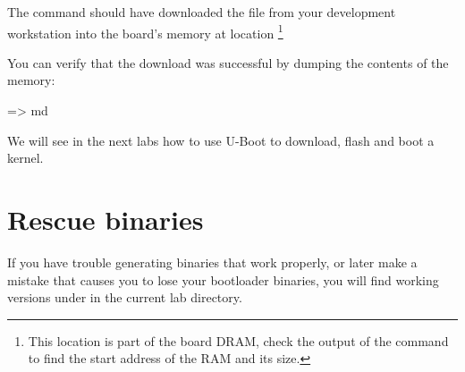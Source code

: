 The  command should have downloaded the 
file from your development workstation into the board's memory at
location {\tt \zimageboardaddr}\footnote{ This location is part of the
board DRAM, check the output of the  command to find the
start address of the RAM and its size.}

You can verify that the download was successful by dumping the
contents of the memory:

\begin{ubootinput}
=> md %
\end{ubootinput}

We will see in the next labs how to use U-Boot to download, flash and
boot a kernel.

\section{Rescue binaries}

If you have trouble generating binaries that work properly, or later
make a mistake that causes you to lose your bootloader binaries, you
will find working versions under  in the current lab
directory.
